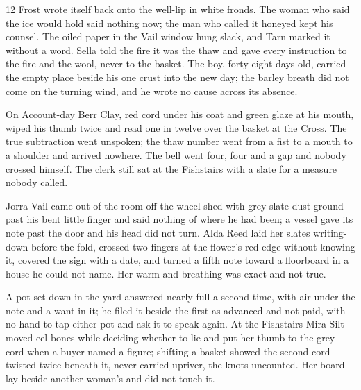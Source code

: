 






\CRtailpiece
\begin{CRchronicle}{12}
Frost wrote itself back onto the well-lip in white fronds. The woman who said the ice would hold said nothing now; the man who called it honeyed kept his counsel. The oiled paper in the Vail window hung slack, and Tarn marked it without a word. Sella told the fire it was the thaw and gave every instruction to the fire and the wool, never to the basket. The boy, forty-eight days old, carried the empty place beside his one crust into the new day; the barley breath did not come on the turning wind, and he wrote no cause across its absence.

On Account-day Berr Clay, red cord under his coat and green glaze at his mouth, wiped his thumb twice and read one in twelve over the basket at the Cross. The true subtraction went unspoken; the thaw number went from a fist to a mouth to a shoulder and arrived nowhere. The bell went four, four and a gap and nobody crossed himself. The clerk still sat at the Fishstairs with a slate for a measure nobody called.

Jorra Vail came out of the room off the wheel-shed with grey slate dust ground past his bent little finger and said nothing of where he had been; a vessel gave its note past the door and his head did not turn. Alda Reed laid her slates writing-down before the fold, crossed two fingers at the flower’s red edge without knowing it, covered the sign with a date, and turned a fifth note toward a floorboard in a house he could not name. Her warm and breathing was exact and not true.

A pot set down in the yard answered nearly full a second time, with air under the note and a want in it; he filed it beside the first as advanced and not paid, with no hand to tap either pot and ask it to speak again. At the Fishstairs Mira Silt moved eel-bones while deciding whether to lie and put her thumb to the grey cord when a buyer named a figure; shifting a basket showed the second cord twisted twice beneath it, never carried upriver, the knots uncounted. Her board lay beside another woman’s and did not touch it.


\end{CRchronicle}
